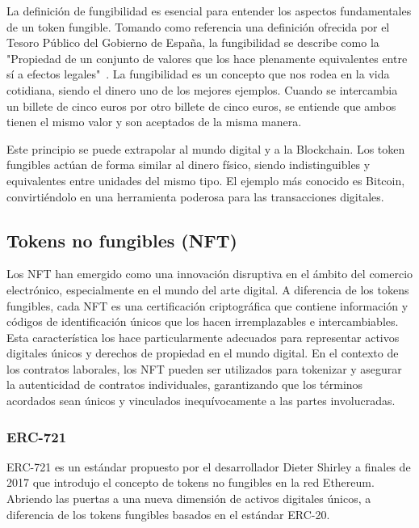 La definición de fungibilidad es esencial para entender los aspectos fundamentales de un token fungible. Tomando como referencia una definición ofrecida por el Tesoro Público del Gobierno de España, la fungibilidad se describe como la "Propiedad de un conjunto de valores que los hace plenamente equivalentes entre sí a efectos legales"~\cite{fungibilidadGob}.
La fungibilidad es un concepto que nos rodea en la vida cotidiana, siendo el dinero uno de los mejores ejemplos. Cuando se intercambia un billete de cinco euros por otro billete de cinco euros, se entiende que ambos tienen el mismo valor y son aceptados de la misma manera.

Este principio se puede extrapolar al mundo digital y a la Blockchain. Los token fungibles actúan de forma similar al dinero físico, siendo indistinguibles y equivalentes entre unidades del mismo tipo.
El ejemplo más conocido es Bitcoin, convirtiéndolo en una herramienta poderosa para las transacciones digitales.


\subsection{Tokens no fungibles (NFT)}

Los NFT han emergido como una innovación disruptiva en el ámbito del comercio electrónico, especialmente en el mundo del arte digital.
A diferencia de los tokens fungibles, cada NFT es una certificación criptográfica que contiene información y códigos de identificación únicos que los hacen irremplazables e intercambiables.
Esta característica los hace particularmente adecuados para representar activos digitales únicos y derechos de propiedad en el mundo digital.
En el contexto de los contratos laborales, los NFT pueden ser utilizados para tokenizar y asegurar la autenticidad de contratos individuales, garantizando que los términos acordados sean únicos y vinculados inequívocamente a las partes involucradas.~\cite{NFTintroducción}


\subsubsection{ERC-721}

ERC-721 es un estándar propuesto por el desarrollador Dieter Shirley a finales de 2017 que introdujo el concepto de tokens no fungibles en la red Ethereum. ~\cite{ERC721Introducción}
Abriendo las puertas a una nueva dimensión de activos digitales únicos, a diferencia de los tokens fungibles basados en el estándar ERC-20.

